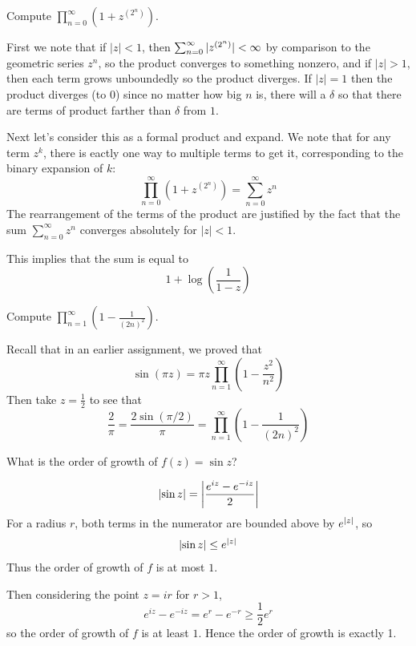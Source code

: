 \documentclass{homework}
\begin{document}
        \begin{problem}
          Compute $\displaystyle\prod_{n=0}^\infty \left( 1 + z^{(2^n)} \right)$.
          \end{problem}
          \begin{solution}
          First we note that if $|z| < 1$, then $\sum_{n=0}^\infty |z^{(2^n)}| < \infty$ by comparison to the geometric series $z^n$, so the product converges to something nonzero, and if $|z| > 1$, then each term grows unboundedly so the product diverges. If $|z|=1$ then the product diverges (to 0) since no matter how big $n$ is, there will a $\delta$ so that there are terms of product farther than $\delta$ from $1$.

          Next let's consider this as a formal product and expand. We note that
          for any term $z^k$, there is eactly one way to multiple terms to get it, corresponding to the binary expansion of $k$:
          \[
          \prod_{n=0}^\infty \left( 1 + z^{(2^n)} \right) = \sum_{n=0}^\infty z^n
          \]
          The rearrangement of the terms of the product are justified by the fact that the sum $\sum_{n=0}^\infty z^n$ converges absolutely for $|z|< 1$. %

          This implies that the sum is equal to 
          \[
          1 + \log(\frac{1}{1-z})
          \]
          \end{solution}
          \begin{problem}
            Compute $\displaystyle\prod_{n=1}^\infty \left( 1 - \frac{1}{(2n)^2} \right)$.
            \end{problem}
            \begin{solution}
            Recall that in an earlier assignment, we proved that 
            \[
            \sin \left( \pi z \right) = \pi z \prod_{n=1}^\infty \left( 1 - \frac{z^2}{n^2} \right)
            \]
            Then take $z=\frac{1}{2}$ to see that 
            \[
            \frac{2}{\pi} = \frac{2\sin \left( \pi/2 \right)}{\pi} = \prod_{n=1}^\infty \left( 1 - \frac{1}{(2n)^2} \right)
            \]
            \end{solution}
            \begin{problem}
              What is the order of growth of $f(z) = \sin z$?
              \end{problem}
              \begin{solution}
              \begin{align*}
              \left|\sin z\right| = \left|\frac{e^{iz} - e^{-iz}}{2}\right|
              \end{align*}
              For a radius $r$, both terms in the numerator are bounded above by $e^{\left|z\right|}$, so 
              \begin{align*}
              \left|\sin z\right| \leq e^{\left|z\right|}
              \end{align*}
              Thus the order of growth of $f$ is at most $1$.

              Then considering the point $z=ir$ for $r>1$, 
              \[
              e^{iz} - e^{-iz} = e^{r} - e^{-r} \geq \frac{1}{2}e^{r}
              \]
              so the order of growth of $f$ is at least $1$. Hence the order of growth is exactly 1.
              \end{solution}
\end{document}

